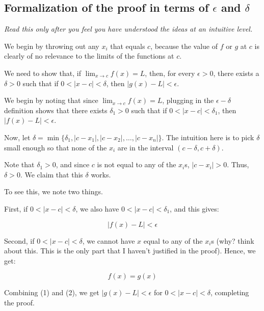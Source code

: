 \documentclass[10pt]{amsart}
\begin{document}
\subsection{Formalization of the proof in terms of $\epsilon$ and $\delta$}

{\em Read this only after you feel you have understood the ideas at an
intuitive level.}

We begin by throwing out any $x_i$ that equals $c$, because the value
of $f$ or $g$ at $c$ is clearly of no relevance to the limits of the
functions at $c$.

We need to show that, if $\lim_{x \to c} f(x) = L$, then, for every
$\epsilon > 0$, there exists a $\delta > 0$ such that if $0 < |x - c|
< \delta$, then $|g(x) - L| < \epsilon$.

We begin by noting that since $\lim_{x \to c} f(x) = L$, plugging in
the $\epsilon-\delta$ definition shows that there exists $\delta_1 >
0$ such that if $0 < |x - c| < \delta_1$, then $|f(x) - L| < \epsilon$.

Now, let $\delta = \min \{ \delta_1, |c - x_1|, |c - x_2|, \dots, |c -
x_n| \}$. The intuition here is to pick $\delta$ small enough so that
none of the $x_i$ are in the interval $(c - \delta, c + \delta)$.

Note that $\delta_1 > 0$, and since $c$ is not equal to any of the
$x_i$s, $|c - x_i| > 0$. Thus, $\delta > 0$. We claim that this
$\delta$ works.

To see this, we note two things.

First, if $0 < |x - c| < \delta$, we also have $0 < |x - c| <
\delta_1$, and this gives:

\begin{equation*}
  |f(x) - L| < \epsilon \tag{1}
\end{equation*}

Second, if $0 < |x - c| < \delta$, we cannot have $x$ equal to any of
the $x_i$s (why? think about this. This is the only part that I
haven't justified in the proof). Hence, we get:

\begin{equation*}
  f(x) = g(x) \tag{2}
\end{equation*}

Combining (1) and (2), we get $|g(x) - L| < \epsilon$ for $0 < |x - c|
< \delta$, completing the proof.
\end{document}
